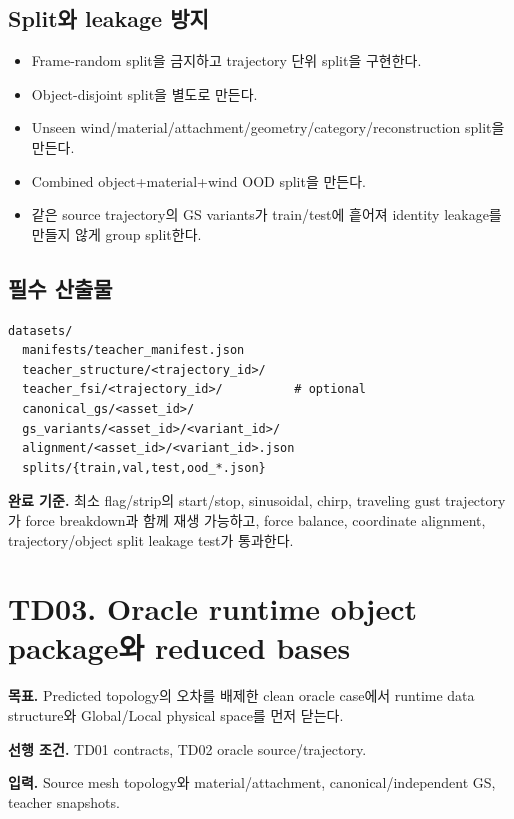 \documentclass[10pt,a4paper]{article}
\newcommand{\todo}{\textcolor{TodoGray}{\(\square\)}}
\begin{document}
\subsection*{Split와 leakage 방지}

\begin{itemize}
  \item[\todo] Frame-random split을 금지하고 trajectory 단위 split을 구현한다.
  \item[\todo] Object-disjoint split을 별도로 만든다.
  \item[\todo] Unseen wind/material/attachment/geometry/category/reconstruction split을 만든다.
  \item[\todo] Combined object+material+wind OOD split을 만든다.
  \item[\todo] 같은 source trajectory의 GS variants가 train/test에 흩어져 identity leakage를 만들지 않게 group split한다.
\end{itemize}

\subsection*{필수 산출물}

\begin{lstlisting}
datasets/
  manifests/teacher_manifest.json
  teacher_structure/<trajectory_id>/
  teacher_fsi/<trajectory_id>/          # optional
  canonical_gs/<asset_id>/
  gs_variants/<asset_id>/<variant_id>/
  alignment/<asset_id>/<variant_id>.json
  splits/{train,val,test,ood_*.json}
\end{lstlisting}

\textbf{완료 기준.}
최소 flag/strip의 start/stop, sinusoidal, chirp, traveling gust trajectory가 force breakdown과 함께 재생 가능하고,
force balance, coordinate alignment, trajectory/object split leakage test가 통과한다.

\section{TD03. Oracle runtime object package와 reduced bases}

\textbf{목표.}
Predicted topology의 오차를 배제한 clean oracle case에서 runtime data structure와 Global/Local physical space를 먼저 닫는다.

\textbf{선행 조건.} TD01 contracts, TD02 oracle source/trajectory.

\textbf{입력.}
Source mesh topology와 material/attachment, canonical/independent GS, teacher snapshots.
\end{document}
